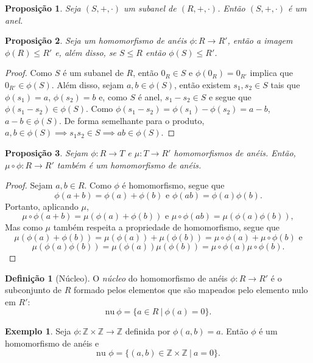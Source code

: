 \documentclass[a4paper,12pt]{article}
\theoremstyle{plain}
\newtheorem{proposicao}{Proposição}[section]
\theoremstyle{definition}
\newtheorem{definicao}{Definição}[section]
\newtheorem{exemplo}{Exemplo}[section]
\begin{document}
	\begin{proposicao}
		Seja $(S,+, \cdot)$ um subanel de $(R,+, \cdot)$. Então $(S,+, \cdot)$ é um anel.	
	\end{proposicao}

	\begin{proposicao}
		Seja um homomorfismo de anéis $\phi: R \longrightarrow R'$, então a imagem $\phi(R) \leq R'$ e, além disso, se $S\leq R$ então $\phi(S) \leq R'$.
	\end{proposicao}

	\begin{proof}
		Como $S$ é um subanel de $R$, então $0_R\in S$ e $\phi(0_R) = 0_{R'}$ implica que $0_{R'} \in \phi(S)$. Além disso, sejam $a,b\in \phi(S)$, então existem $s_1,s_2 \in S$ tais que $\phi(s_1) = a$, $\phi(s_2) = b$ e, como $S$ é anel, $s_1 - s_2 \in S$ e segue que $\phi(s_1 - s_2) \in \phi(S)$. Como $\phi(s_1 - s_2) = \phi(s_1) - \phi(s_2) = a - b$, $a-b\in \phi(S)$. De forma semelhante para o produto, $a,b \in \phi(S) \implies s_1s_2 \in S \implies ab \in \phi(S)$.
	\end{proof}
	
	\begin{proposicao}
		Sejam $\phi: R \longrightarrow T$ e $\mu: T\longrightarrow R'$ homomorfismos de anéis. Então, $\mu\circ\phi: R\longrightarrow R'$ também é um homomorfismo de anéis.	
	\end{proposicao}
	\begin{proof}
		Sejam $a,b \in R$. Como $\phi$ é homomorfismo, segue que $$\phi(a+b) = \phi(a) + \phi(b) \text{ e } \phi(ab) = \phi(a)\phi(b).$$
		Portanto, aplicando $\mu$,
		$$\mu\circ\phi(a+b) = \mu(\phi(a) + \phi(b)) \text{ e } \mu\circ\phi(ab) = \mu(\phi(a)\phi(b)),$$
		Mas como $\mu$ também respeita a propriedade de homomorfismo, segue que
		$$\mu(\phi(a) + \phi(b)) = \mu(\phi(a)) + \mu(\phi(b)) = \mu\circ\phi(a) + \mu\circ\phi(b)\text{ e}$$
		$$\mu(\phi(a)\phi(b)) = \mu(\phi(a))\mu(\phi(b)) = \mu\circ\phi(a)\mu\circ\phi(b).$$
	\end{proof}
	
	\begin{definicao}[Núcleo]
		O \emph{núcleo} do homomorfismo de anéis $\phi: R \longrightarrow R'$ é o subconjunto de $R$ formado pelos elementos que são mapeados pelo elemento nulo em
		$R'$: $$\text{nu} \ \phi = \{a \in R \ | \ \phi(a) = 0\}.$$
	\end{definicao}
	
	\begin{exemplo}
		Seja $\phi: \mathbb{Z}\times \mathbb{Z} \longrightarrow \mathbb{Z}$ definida por $\phi(a,b) = a$. Então $\phi$ é um homomorfismo de anéis e
		$$\text{nu }\phi = \{(a,b) \in \mathbb{Z}\times \mathbb{Z} \ | \ a = 0\}.$$
	\end{exemplo}
	
\end{document}
